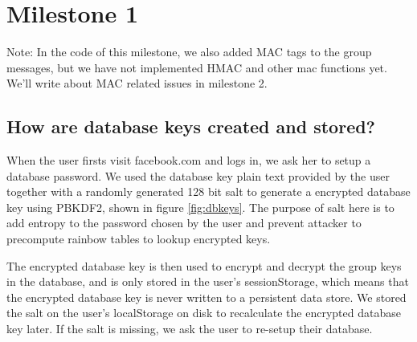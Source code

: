
\usepackage{graphicx,amssymb,amsmath,enumerate}
\usepackage{courier}
\usepackage{color}
\usepackage{listings}
\usepackage{fancyvrb}
\usepackage{stmaryrd}

\oddsidemargin 0in
\evensidemargin 0in
\textwidth 6.5in
\topmargin -0.5in
\textheight 9.0in




\pagestyle{myheadings}  %


\section{Milestone 1}

Note: In the code of this milestone, we also added MAC tags to the group messages, but we have not implemented HMAC and other mac functions yet. We'll write about MAC related issues in milestone 2. 

\subsection{How are database keys created and stored?}

When the user firsts visit facebook.com and logs in, we ask her to setup a database password. We used the database key plain text provided by the user together with a randomly generated 128 bit salt to generate a encrypted database key using PBKDF2, shown in figure \ref{fig:dbkeys}. The purpose of salt here is to add entropy to the password chosen by the user and prevent attacker to precompute rainbow tables to lookup encrypted keys. 

The encrypted database key is then used to encrypt and decrypt the group keys in the database, and is only stored in the user's sessionStorage, which means that the encrypted database key is never written to a persistent data store. We stored the salt on the user's localStorage on disk to recalculate the encrypted database key later. If the salt is missing, we ask the user to re-setup their database. 

